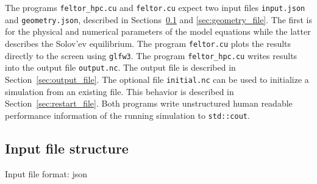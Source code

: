 The programs \texttt{feltor\_hpc.cu} and \texttt{feltor.cu} expect two input
files \texttt{input.json} and \texttt{geometry.json}, described in Sections~\ref{sec:input_file} and \ref{sec:geometry_file}.
The first is for the physical and numerical parameters of the model equations
while the latter describes the Solov'ev equilibrium.
 The program \texttt{feltor.cu} plots the results directly to the screen using \texttt{glfw3}.
The program \texttt{feltor\_hpc.cu} writes results into
the output file \texttt{output.nc}.
 The output file is described in Section~\ref{sec:output_file}.
 The optional file \texttt{initial.nc} can be used to initialize a simulation from an existing file.
 This behavior is described in Section~\ref{sec:restart_file}.
 Both programs write unstructured human readable performance information of the running simulation
 to \texttt{std::cout}.


\subsection{Input file structure} \label{sec:input_file}
Input file format: json


